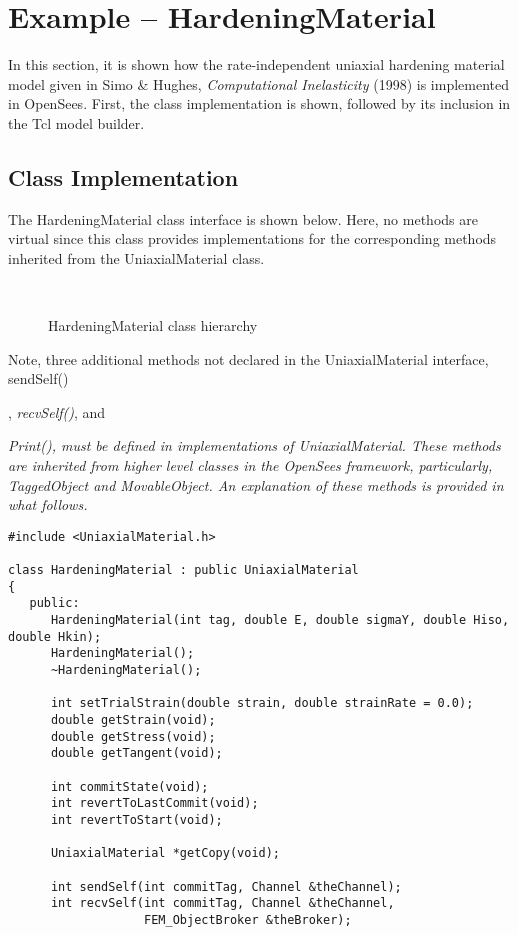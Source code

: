 \documentclass[12pt]{article}
\begin{document}
{\section{Example -- HardeningMaterial}
In this section, it is shown how the rate-independent uniaxial hardening material model
given in Simo \& Hughes, {\em Computational Inelasticity} (1998) is implemented in OpenSees.
First, the class implementation
is shown, followed by its inclusion in the Tcl model builder.

\subsection{Class Implementation}
The HardeningMaterial class interface is shown below. Here, no methods are virtual
since this class provides implementations for the corresponding methods inherited from
the UniaxialMaterial class.

\begin{figure}[htpb]
\begin{center}
\leavevmode
\hbox{%
}
\end{center}
\caption{HardeningMaterial class hierarchy}
\label{fig:Hardening}
\end{figure}

Note, three additional methods not declared in the UniaxialMaterial interface,
sendSelf()}, {\em recvSelf()}, and {\em Print(), must be defined in implementations 
of UniaxialMaterial. These methods are inherited from higher level classes in the OpenSees
framework, particularly, TaggedObject and MovableObject. An explanation of these methods
is provided in what follows.

{\sf\small
\begin{verbatim}
#include <UniaxialMaterial.h>

class HardeningMaterial : public UniaxialMaterial
{
   public:
      HardeningMaterial(int tag, double E, double sigmaY, double Hiso, double Hkin);
      HardeningMaterial();
      ~HardeningMaterial();

      int setTrialStrain(double strain, double strainRate = 0.0); 
      double getStrain(void);          
      double getStress(void);
      double getTangent(void);

      int commitState(void);
      int revertToLastCommit(void);    
      int revertToStart(void);        

      UniaxialMaterial *getCopy(void);
    
      int sendSelf(int commitTag, Channel &theChannel);  
      int recvSelf(int commitTag, Channel &theChannel, 
                   FEM_ObjectBroker &theBroker);    
    

\end{verbatim}}}
\end{document}
